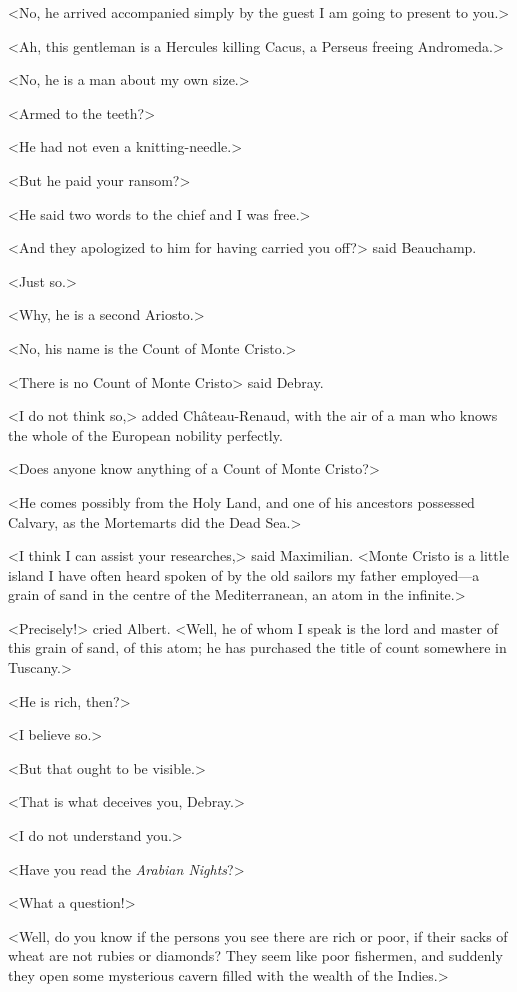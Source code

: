  <No, he arrived accompanied simply by the guest I am going to present to you.> 

 <Ah, this gentleman is a Hercules killing Cacus, a Perseus freeing Andromeda.> 

 <No, he is a man about my own size.> 

 <Armed to the teeth?> 

 <He had not even a knitting-needle.> 

 <But he paid your ransom?> 

 <He said two words to the chief and I was free.> 

 <And they apologized to him for having carried you off?> said Beauchamp. 

 <Just so.> 

 <Why, he is a second Ariosto.> 

 <No, his name is the Count of Monte Cristo.> 

 <There is no Count of Monte Cristo> said Debray. 

 <I do not think so,> added Château-Renaud, with the air of a man who knows the whole of the European nobility perfectly. 

 <Does anyone know anything of a Count of Monte Cristo?> 

 <He comes possibly from the Holy Land, and one of his ancestors possessed Calvary, as the Mortemarts did the Dead Sea.> 

 <I think I can assist your researches,> said Maximilian. <Monte Cristo is a little island I have often heard spoken of by the old sailors my father employed—a grain of sand in the centre of the Mediterranean, an atom in the infinite.> 

 <Precisely!> cried Albert. <Well, he of whom I speak is the lord and master of this grain of sand, of this atom; he has purchased the title of count somewhere in Tuscany.> 

 <He is rich, then?> 

 <I believe so.> 

 <But that ought to be visible.> 

 <That is what deceives you, Debray.> 

 <I do not understand you.> 

 <Have you read the \textit{Arabian Nights}?> 

 <What a question!> 

 <Well, do you know if the persons you see there are rich or poor, if their sacks of wheat are not rubies or diamonds? They seem like poor fishermen, and suddenly they open some mysterious cavern filled with the wealth of the Indies.> 

